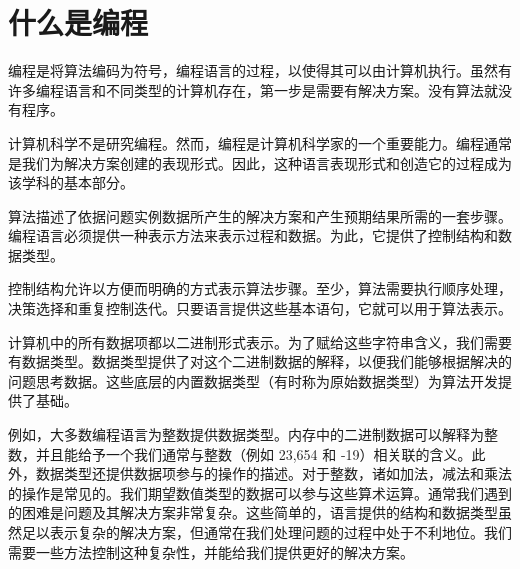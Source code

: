 \section{什么是编程}

编程是将算法编码为符号，编程语言的过程，以使得其可以由计算机执行。虽然有许多编程语言和不同类型的计算机存在，第一步是需要有解决方案。没有算法就没有程序。

计算机科学不是研究编程。然而，编程是计算机科学家的一个重要能力。编程通常是我们为解决方案创建的表现形式。因此，这种语言表现形式和创造它的过程成为该学科的基本部分。

算法描述了依据问题实例数据所产生的解决方案和产生预期结果所需的一套步骤。编程语言必须提供一种表示方法来表示过程和数据。为此，它提供了控制结构和数据类型。

控制结构允许以方便而明确的方式表示算法步骤。至少，算法需要执行顺序处理，决策选择和重复控制迭代。只要语言提供这些基本语句，它就可以用于算法表示。

计算机中的所有数据项都以二进制形式表示。为了赋给这些字符串含义，我们需要有数据类型。数据类型提供了对这个二进制数据的解释，以便我们能够根据解决的问题思考数据。这些底层的内置数据类型（有时称为原始数据类型）为算法开发提供了基础。

例如，大多数编程语言为整数提供数据类型。内存中的二进制数据可以解释为整数，并且能给予一个我们通常与整数（例如 23,654 和 -19）相关联的含义。此外，数据类型还提供数据项参与的操作的描述。对于整数，诸如加法，减法和乘法的操作是常见的。我们期望数值类型的数据可以参与这些算术运算。通常我们遇到的困难是问题及其解决方案非常复杂。这些简单的，语言提供的结构和数据类型虽然足以表示复杂的解决方案，但通常在我们处理问题的过程中处于不利地位。我们需要一些方法控制这种复杂性，并能给我们提供更好的解决方案。
